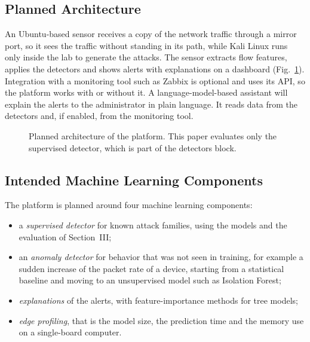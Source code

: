\documentclass[conference]{IEEEtran}
\newif\ifshowtodo
\newcommand{\todo}[1]{\ifshowtodo{\color{red}\textbf{[TODO: #1]}}\fi}
\begin{document}
\subsection{Planned Architecture}
An Ubuntu-based sensor receives a copy of the network traffic through a mirror port, so it sees the traffic without standing in its path, while Kali Linux runs only inside the lab to generate the attacks. The sensor extracts flow features, applies the detectors and shows alerts with explanations on a dashboard (Fig.~\ref{fig:arch}). Integration with a monitoring tool such as Zabbix is optional and uses its API, so the platform works with or without it. A language-model-based assistant will explain the alerts to the administrator in plain language. It reads data from the detectors and, if enabled, from the monitoring tool.

\begin{figure}[t]
\centering
{}
\caption{Planned architecture of the platform. This paper evaluates only the supervised detector, which is part of the detectors block.}
\label{fig:arch}
\end{figure}

\subsection{Intended Machine Learning Components}
The platform is planned around four machine learning components:
\begin{itemize}
\item a \emph{supervised detector} for known attack families, using the models and the evaluation of Section~III;
\item an \emph{anomaly detector} for behavior that was not seen in training, for example a sudden increase of the packet rate of a device, starting from a statistical baseline and moving to an unsupervised model such as Isolation Forest; \todo{choose the method after the first results and add references}
\item \emph{explanations} of the alerts, with feature-importance methods for tree models; \todo{add references}
\item \emph{edge profiling}, that is the model size, the prediction time and the memory use on a single-board computer.
\end{itemize}
\end{document}
